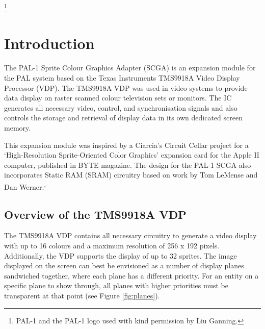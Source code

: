 \documentclass[a4paper,11pt,twoside,openright]{report}
\begin{document}
\thanks{PAL-1 and the PAL-1 logo used with kind permission by Liu Ganning.}
\clearpage
\tableofcontents
\listoffigures
\cleardoublepage
\chapter*{Introduction}
The PAL-1 Sprite Colour Graphics Adapter (SCGA) is an expansion module for the PAL system\cite{ganning1} based on the Texas Instruments TMS9918A Video Display Processor (VDP)\cite{texas1}. The TMS9918A VDP was used in video systems to provide data display on raster scanned colour television sets or monitors. The IC generates all necessary video, control, and synchronisation signals and also controls the storage and retrieval of display data in its own dedicated screen memory.


This expansion module was inspired by a Ciarcia's Circuit Cellar project for a `High-Resolution Sprite-Oriented Color Graphics' expansion card for the Apple II computer, published in BYTE magazine.\cite[pp. 57--80]{byte1} The design for the PAL-1 SCGA also incorporates Static RAM (SRAM) circuitry based on work by Tom LeMense and Dan Werner.\cite{lemense1}\textsuperscript{,}\cite{werner1}

\section*{Overview of the TMS9918A VDP}
The TMS9918A VDP contains all necessary circuitry to generate a video display with up to 16 colours and a maximum resolution of 256 x 192 pixels. Additionally, the VDP supports the display of up to 32 sprites. The image displayed on the screen can best be envisioned as a number of display planes sandwiched together, where each plane has a different priority. For an entity on a specific plane to show through, all planes with higher priorities must be transparent at that point (see Figure \ref{fig:planes}).
\end{document}
